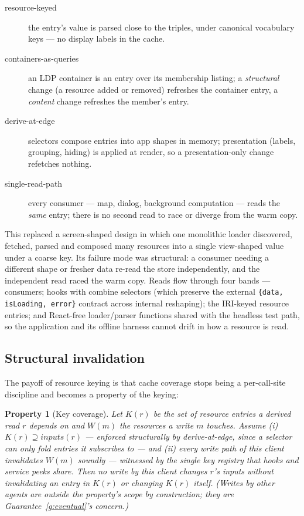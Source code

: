 \documentclass[11pt,a4paper]{article}
\newtheorem{property}{Property}[section]
\theoremstyle{remark}
\newcommand{\code}[1]{\texttt{#1}}
\begin{document}
\begin{description}
\item[resource-keyed] the entry's value is parsed close to the triples, under
  canonical vocabulary keys --- no display labels in the cache.
\item[containers-as-queries] an LDP container is an entry over its membership
  listing; a \emph{structural} change (a resource added or removed) refreshes the
  container entry, a \emph{content} change refreshes the member's entry.
\item[derive-at-edge] selectors compose entries into app shapes in memory;
  presentation (labels, grouping, hiding) is applied at render, so a
  presentation-only change refetches nothing.
\item[single-read-path] every consumer --- map, dialog, background computation
  --- reads the \emph{same} entry; there is no second read to race or diverge
  from the warm copy.
\end{description}

This replaced a screen-shaped design in which one monolithic loader discovered,
fetched, parsed and composed many resources into a single view-shaped value under
a coarse key. Its failure mode was structural: a consumer needing a different
shape or fresher data re-read the store independently, and the independent read
raced the warm copy. Reads flow through four bands --- consumers; hooks with
combine selectors (which preserve the external
\code{\{data, isLoading, error\}} contract across internal reshaping); the
IRI-keyed resource entries; and React-free loader/parser functions shared with
the headless test path, so the application and its offline harness cannot drift
in how a resource is read.

\subsection{Structural invalidation}\label{sec:coverage}

The payoff of resource keying is that cache coverage stops being a per-call-site
discipline and becomes a property of the keying:

\begin{property}[Key coverage]\label{prop:coverage}
Let $K(r)$ be the set of resource entries a derived read $r$ depends on and
$W(m)$ the resources a write $m$ touches. Assume (i) $K(r) \supseteq
\mathit{inputs}(r)$ --- enforced structurally by derive-at-edge, since a
selector can only fold entries it subscribes to --- and (ii) every write path
of this client invalidates $W(m)$ soundly --- witnessed by the single key
registry that hooks and service peeks share. Then no write \emph{by this
client} changes $r$'s inputs without invalidating an entry in $K(r)$ or
changing $K(r)$ itself. (Writes by other agents are outside the property's
scope by construction; they are Guarantee~\ref{g:eventual}'s concern.)
\end{property}
\end{document}
